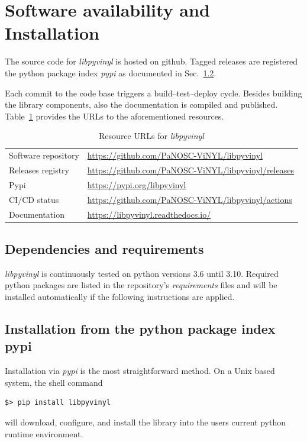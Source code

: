 \documentclass[11pt, a4paper]{article}
\begin{document}
\section{Software availability and Installation}
\label{sec:installation}
The source code for \textit{libpyvinyl} is hosted on github.
Tagged releases are registered 
the python package index \textit{pypi} as documented in Sec.~\ref{sec:pypi}.

Each commit to the code base triggers a build--test--deploy cycle. 
Besides building the library components, also the documentation is compiled
and published. Table~\ref{tab:links} provides the URLs to the aforementioned
resources.

\begin{table}[ht]
  \centering
  \begin{tabular}{l|l}
 Software repository &   \url{https://github.com/PaNOSC-ViNYL/libpyvinyl} \\
 Releases registry &   \url{https://github.com/PaNOSC-ViNYL/libpyvinyl/releases} \\
 Pypi & \url{https://pypi.org/libpyvinyl} \\
 CI/CD status &   \url{https://github.com/PaNOSC-ViNYL/libpyvinyl/actions} \\
 Documentation &    \url{https://libpyvinyl.readthedocs.io/}
  \end{tabular}
  \caption{Resource URLs for \textit{libpyvinyl}}
  \label{tab:links}
\end{table}
 

\subsection{Dependencies and requirements}
\label{sec:dep}

\textit{libpyvinyl} is continuously tested on python versions 3.6 until 3.10.
Required python packages are listed in the repository's \textit{requirements}
files and will be installed automatically if the following instructions are applied.

\subsection{Installation from the python package index pypi}
\label{sec:pypi}

Installation via \textit{pypi} is the most straightforward method. On a Unix based
system, the shell command
\begin{verbatim}
$> pip install libpyvinyl
\end{verbatim}
will download, configure, and install the library into the users current python
runtime environment.
\end{document}
